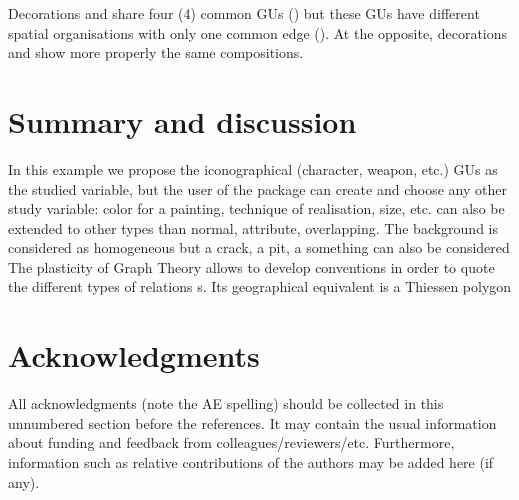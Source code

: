 \documentclass[article]{jss}\usepackage{knitr}
\begin{document}
Decorations  and  share four (4) common GUs () but  these GUs have different spatial organisations with only one common edge (). At the opposite, decorations  and  show more properly the same compositions.


\section{Summary and discussion} \label{sec:summary}

In this example we propose the iconographical  (character, weapon, etc.) GUs as the studied variable, but the user of the package can create and choose any other study variable: color for a painting, technique of realisation, size, etc.
 can also be extended to other types than normal, attribute, overlapping.
The background is considered as homogeneous but a crack, a pit, a something can also be considered
The plasticity of Graph Theory allows to develop conventions in order to quote the different types of relations s.
Its geographical equivalent is a Thiessen polygon




\section*{Acknowledgments}

\begin{leftbar}
All acknowledgments (note the AE spelling) should be collected in this
unnumbered section before the references. It may contain the usual information
about funding and feedback from colleagues/reviewers/etc. Furthermore,
information such as relative contributions of the authors may be added here
(if any).
\end{leftbar}




\end{document}
